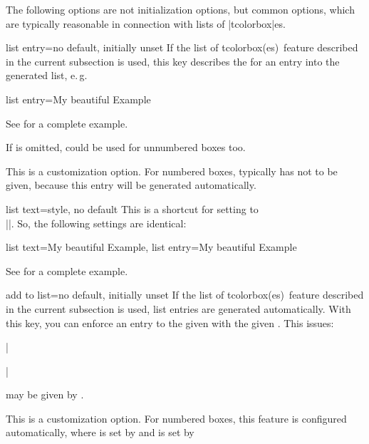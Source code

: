 \clearpage

\begin{marker}
The following options are not initialization options, but common options,
which are typically reasonable in connection with lists of |tcolorbox|es.
\end{marker}

\begin{docTcbKey}{list entry}{=}{no default, initially unset}
If the \flqq list of tcolorbox(es)\frqq\ feature described in
the current subsection
is used, this key
describes the  for an entry into the generated list, e.\,g.
\begin{dispListing}
list entry={\protect\numberline{\thetcbcounter}My beautiful Example}
\end{dispListing}
See  for a complete example.\par
If  is omitted,  could be used for
unnumbered boxes too.
\begin{marker}
This is a customization option. For numbered boxes, 
typically has not to be given, because this entry will be generated automatically.
\end{marker}
\end{docTcbKey}

\begin{docTcbKey}[][doc new=2014-09-19]{list text}{=}{style, no default}
This is a shortcut for setting  to\\
|\protect\numberline{\thetcbcounter}|.
So, the following settings are identical:
\begin{dispListing}
list text={My beautiful Example},
list entry={\protect\numberline{\thetcbcounter}My beautiful Example}
\end{dispListing}
See  for a complete example.
\end{docTcbKey}

\begin{docTcbKey}{add to list}{=}{no default, initially unset}
If the \flqq list of tcolorbox(es)\frqq\ feature described in
the current subsection
is used, list entries are
generated automatically. With this key, you can enforce an entry to the
given  with the given .
This issues:\par
|\addcontentsline|\par
{} may be given by .
\begin{marker}
This is a customization option. For numbered boxes, this feature is configured
automatically, where
 is set by  and
 is set by 
\end{marker}
\end{docTcbKey}

